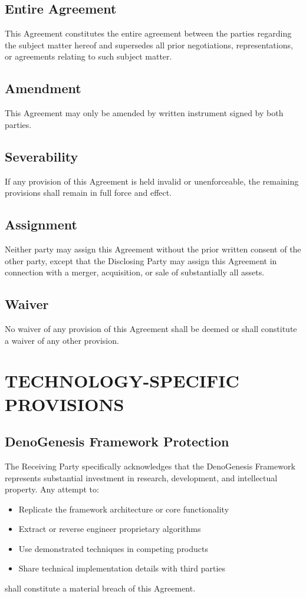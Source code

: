 \documentclass[11pt,letterpaper]{article}
\begin{document}
\subsection{Entire Agreement}
This Agreement constitutes the entire agreement between the parties regarding the subject matter hereof and supersedes all prior negotiations, representations, or agreements relating to such subject matter.

\subsection{Amendment}
This Agreement may only be amended by written instrument signed by both parties.

\subsection{Severability}
If any provision of this Agreement is held invalid or unenforceable, the remaining provisions shall remain in full force and effect.

\subsection{Assignment}
Neither party may assign this Agreement without the prior written consent of the other party, except that the Disclosing Party may assign this Agreement in connection with a merger, acquisition, or sale of substantially all assets.

\subsection{Waiver}
No waiver of any provision of this Agreement shall be deemed or shall constitute a waiver of any other provision.

\section{TECHNOLOGY-SPECIFIC PROVISIONS}

\subsection{DenoGenesis Framework Protection}
The Receiving Party specifically acknowledges that the DenoGenesis Framework represents substantial investment in research, development, and intellectual property. Any attempt to:
\begin{itemize}[leftmargin=0.5cm]
    \item Replicate the framework architecture or core functionality
    \item Extract or reverse engineer proprietary algorithms
    \item Use demonstrated techniques in competing products
    \item Share technical implementation details with third parties
\end{itemize}
shall constitute a material breach of this Agreement.
\end{document}
